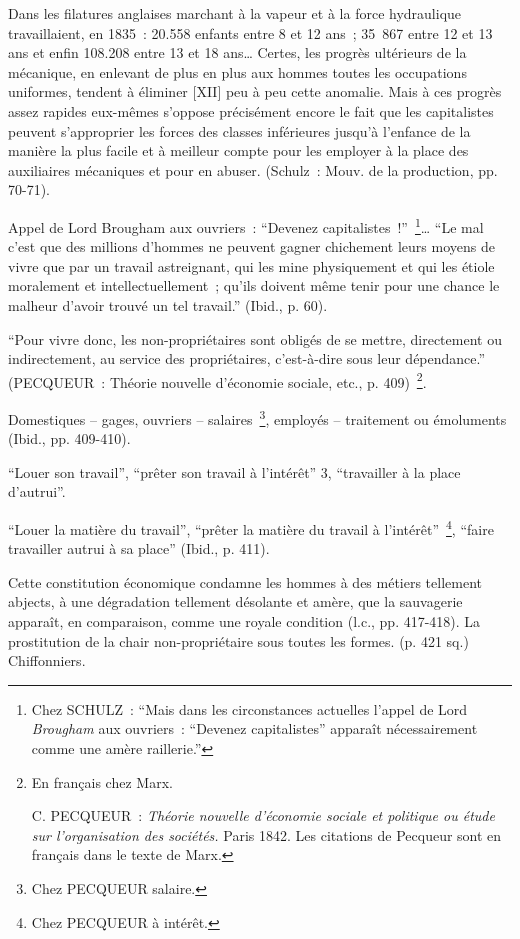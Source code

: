 \documentclass[french,twoside]{book} %
\newenvironment{quoteblock}%
  {\begin{quoting}}
  {\end{quoting}}
\newenvironment{quotebar}{%
    \def\FrameCommand{{\color{rubric!10!}\vrule width 0.5em} \hspace{0.9em}}%
    \def\OuterFrameSep{\itemsep} %
    \MakeFramed {\advance\hsize-\width \FrameRestore}
  }%
  {%
    \endMakeFramed
  }
\renewenvironment{quoteblock}%
  {%
    \savenotes
    \setstretch{0.9}
    \normalfont
    \begin{quotebar}
  }
  {%
    \end{quotebar}
    \spewnotes
  }
\begin{document}
\begin{quoteblock}
 Dans les filatures anglaises marchant à la vapeur et à la force hydraulique travaillaient, en 1835 : 20.558 enfants entre 8 et 12 ans ; 35 867 entre 12 et 13 ans et enfin 108.208 entre 13 et 18 ans… Certes, les progrès ultérieurs de la mécanique, en enlevant de plus en plus aux hommes toutes les occupations uniformes, tendent à éliminer [XII] peu à peu cette anomalie. Mais à ces progrès assez rapides eux-mêmes s’oppose précisément encore le fait que les capitalistes peuvent s’approprier les forces des classes inférieures jusqu’à l’enfance de la manière la plus facile et à meilleur compte pour les employer à la place des auxiliaires mécaniques et pour en abuser. (Schulz : Mouv. de la production, pp. 70-71).\par
 Appel de Lord Brougham aux ouvriers : “Devenez capitalistes !” \footnote{Chez SCHULZ : “Mais dans les circonstances actuelles l’appel de Lord \emph{Brougham} aux ouvriers : “Devenez capitalistes” apparaît nécessairement comme une amère raillerie.”}… “Le mal c’est que des millions d’hommes ne peuvent gagner chichement leurs moyens de vivre que par un travail astreignant, qui les mine physiquement et qui les étiole moralement et intellectuellement ; qu’ils doivent même tenir pour une chance le malheur d’avoir trouvé un tel travail.” (Ibid., p. 60).\par
 “Pour vivre donc, les non-propriétaires sont obligés de se mettre, directement ou indirectement, au service des propriétaires, c’est-à-dire sous leur dépendance.” (PECQUEUR : Théorie nouvelle d’économie sociale, etc., p. 409) \footnote{ \noindent En français chez Marx.\par
 C. PECQUEUR :\emph{ Théorie nouvelle d’économie sociale et politique ou étude sur l’organisation des sociétés.} Paris 1842. Les citations de Pecqueur sont en français dans le texte de Marx.
}.\par
 Domestiques – gages, ouvriers – salaires \footnote{Chez PECQUEUR salaire.}, employés – traitement ou émoluments (Ibid., pp. 409-410).\par
 “Louer son travail”, “prêter son travail à l’intérêt” 3, “travailler à la place d’autrui”.\par
 “Louer la matière du travail”, “prêter la matière du travail à l’intérêt” \footnote{Chez PECQUEUR à intérêt.}, “faire travailler autrui à sa place” (Ibid., p. 411).\par
 [XIII] Cette constitution économique condamne les hommes à des métiers tellement abjects, à une dégradation tellement désolante et amère, que la sauvagerie apparaît, en comparaison, comme une royale condition (l.c., pp. 417-418). La prostitution de la chair non-propriétaire sous toutes les formes. (p. 421 sq.) Chiffonniers.
 \end{quoteblock}
\end{document}
